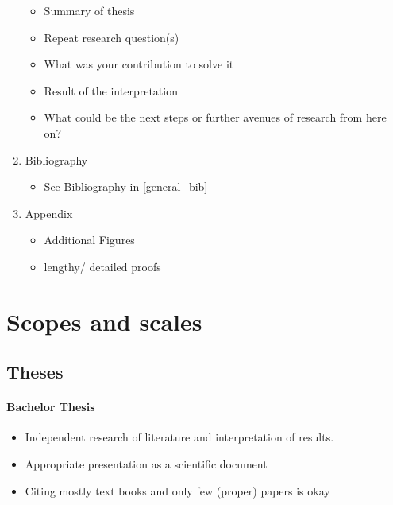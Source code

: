 \documentclass[nodate]{proc}
\begin{document}
\begin{enumerate}
\begin{itemize}
			\item Summary of thesis
			\item Repeat research question(s)
			\item What was your contribution to solve it
			\item Result of the interpretation
			\item What could be the next steps or further avenues of research from here on?
		\end{itemize}
	\item Bibliography
		\begin{itemize}
			\item See Bibliography in \ref{general_bib}
		\end{itemize}
	\item Appendix
		\begin{itemize}
			\item Additional Figures
			\item lengthy/ detailed proofs
		\end{itemize}
\end{enumerate}

\section{Scopes and scales}

\subsection{Theses}

\paragraph{Bachelor Thesis} \label{Scope BA}
\begin{itemize}
	\item Independent research of literature and interpretation of results. 
	\item Appropriate presentation as a scientific document
	\item Citing mostly text books and only few (proper) papers is okay
\end{itemize}
\end{document}
